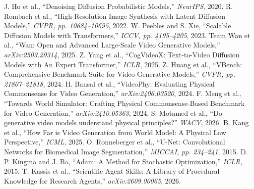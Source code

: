  J. Ho et al., ``Denoising Diffusion Probabilistic Models,'' \emph{NeurIPS}, 2020.
 R. Rombach et al., ``High-Resolution Image Synthesis with Latent Diffusion Models,'' \emph{CVPR, pp. 10684--10695}, 2022.
 W. Peebles and S. Xie, ``Scalable Diffusion Models with Transformers,'' \emph{ICCV, pp. 4195--4205}, 2023.
 Team Wan et al., ``Wan: Open and Advanced Large-Scale Video Generative Models,'' \emph{arXiv:2503.20314}, 2025.
 Z. Yang et al., ``CogVideoX: Text-to-Video Diffusion Models with An Expert Transformer,'' \emph{ICLR}, 2025.
 Z. Huang et al., ``VBench: Comprehensive Benchmark Suite for Video Generative Models,'' \emph{CVPR, pp. 21807--21818}, 2024.
 H. Bansal et al., ``VideoPhy: Evaluating Physical Commonsense for Video Generation,'' \emph{arXiv:2406.03520}, 2024.
 F. Meng et al., ``Towards World Simulator: Crafting Physical Commonsense-Based Benchmark for Video Generation,'' \emph{arXiv:2410.05363}, 2024.
 S. Motamed et al., ``Do generative video models understand physical principles?'' \emph{WACV}, 2026.
 B. Kang et al., ``How Far is Video Generation from World Model: A Physical Law Perspective,'' \emph{ICML}, 2025.
 O. Ronneberger et al., ``U-Net: Convolutional Networks for Biomedical Image Segmentation,'' \emph{MICCAI, pp. 234--241}, 2015.
 D. P. Kingma and J. Ba, ``Adam: A Method for Stochastic Optimization,'' \emph{ICLR}, 2015.
 T. Kassis et al., ``Scientific Agent Skills: A Library of Procedural Knowledge for Research Agents,'' \emph{arXiv:2609.00065}, 2026.
